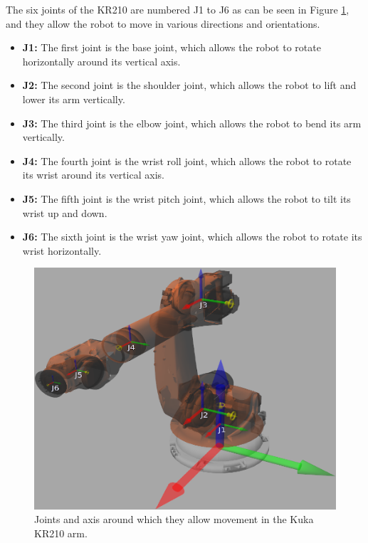 \documentclass[12pt,oneside]{article}
\begin{document}
The six joints of the KR210 are numbered J1 to J6 as can be seen in Figure \ref{fig:kuka5}, and they allow the robot to move in various directions and orientations.
\begin{itemize}
	\item \textbf{J1:}\label{joint:j1} The first joint is the base joint, which allows the robot to rotate horizontally around its vertical axis.
	
	\item \textbf{J2:}\label{joint:j2} The second joint is the shoulder joint, which allows the robot to lift and lower its arm vertically.
	
	\item \textbf{J3:}\label{joint:j3} The third joint is the elbow joint, which allows the robot to bend its arm vertically.
	
	\item \textbf{J4:}\label{joint:j4} The fourth joint is the wrist roll joint, which allows the robot to rotate its wrist around its vertical axis.
	
	\item \textbf{J5:}\label{joint:j5} The fifth joint is the wrist pitch joint, which allows the robot to tilt its wrist up and down.
	
	\item \textbf{J6:}\label{joint:j6} The sixth joint is the wrist yaw joint, which allows the robot to rotate its wrist horizontally.	 
\end{itemize}

\begin{figure}[H]
	\centering
	\includegraphics[width=0.9\linewidth]{kuka5}
	\caption[Joints in the Kuka KR210.]{Joints and axis around which they allow movement in the Kuka KR210 arm.}
	\label{fig:kuka5}
\end{figure}
\end{document}
